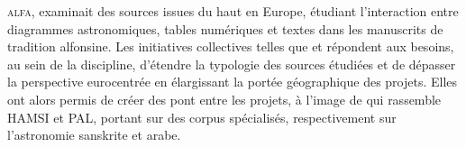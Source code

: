 \textsc{alfa}, examinait des sources issues du haut
\ma en Europe, étudiant l'interaction entre diagrammes
astronomiques, tables numériques et textes dans les manuscrits de
tradition alfonsine. Les initiatives collectives telles que \dishas et \eida répondent aux besoins, au
sein de la discipline, d'étendre la typologie des sources étudiées et
de dépasser la perspective eurocentrée en élargissant la portée
géographique des projets. Elles ont alors permis de créer des pont entre les projets, à l'image de \dishas qui rassemble HAMSI et PAL, portant sur des corpus spécialisés, respectivement sur l'astronomie sanskrite et arabe.